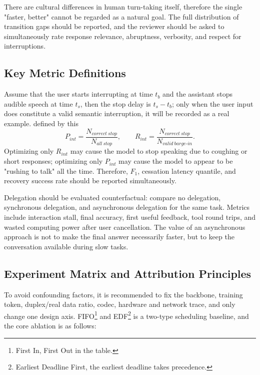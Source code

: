 \documentclass[UTF8,fontset=none,a4paper,10pt]{ctexart}
\begin{document}
There are cultural differences in human turn-taking itself\cite{en:stivers2009turntaking}, therefore the single "faster, better" cannot be regarded as a natural goal. The full distribution of transition gaps should be reported, and the reviewer should be asked to simultaneously rate response relevance, abruptness, verbosity, and respect for interruptions.

\subsection{Key Metric Definitions}

Assume that the user starts interrupting at time $t_b$ and the assistant stops audible speech at time $t_s$, then the stop delay is $t_s-t_b$; only when the user input does constitute a valid semantic interruption, it will be recorded as a real example. defined by this
\begin{equation}
P_{int}=\frac{N_{correct\ stop}}{N_{all\ stop}},\qquad
R_{int}=\frac{N_{correct\ stop}}{N_{valid\ barge\mbox{-}in}}.
\end{equation}
Optimizing only $R_{int}$ may cause the model to stop speaking due to coughing or short responses; optimizing only $P_{int}$ may cause the model to appear to be "rushing to talk" all the time. Therefore, $F_1$, cessation latency quantile, and recovery success rate should be reported simultaneously.

Delegation should be evaluated counterfactual: compare no delegation, synchronous delegation, and asynchronous delegation for the same task. Metrics include interaction stall, final accuracy, first useful feedback, tool round trips, and wasted computing power after user cancellation. The value of an asynchronous approach is not to make the final answer necessarily faster, but to keep the conversation available during slow tasks.

\subsection{Experiment Matrix and Attribution Principles}

To avoid confounding factors, it is recommended to fix the backbone, training token, duplex/real data ratio, codec, hardware and network trace, and only change one design axis. FIFO\footnote{First In, First Out in the table. } and EDF\footnote{Earliest Deadline First, the earliest deadline takes precedence. } is a two-type scheduling baseline, and the core ablation is as follows:
\end{document}
